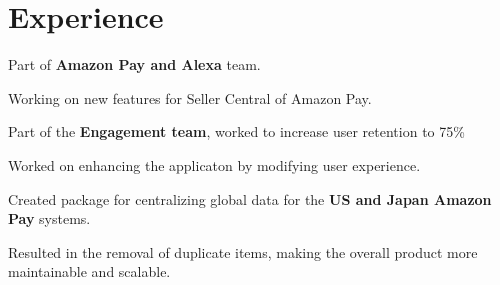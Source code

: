 \documentclass[letterpaper]{deedy-resume} %
\begin{document}
\hfill
%
%
\begin{minipage}[t]{0.66\textwidth} %


\section{Experience}


\vspace{\topsep}
\begin{tightitemize}
\item Part of \textbf{Amazon Pay and Alexa} team.
\item Working on new features for Seller Central of Amazon Pay. 
\end{tightitemize}

\sectionspace %



\begin{tightitemize}
\item Part of the \textbf{Engagement team}, worked to increase user retention to 75\%
\item Worked on enhancing the applicaton by modifying user experience. 
\end{tightitemize}

\sectionspace %



\begin{tightitemize}
\item Created package for centralizing global data for the \textbf{US and Japan Amazon Pay} systems.
\item Resulted in the removal of duplicate items, making the overall product more maintainable and scalable.
\end{tightitemize}


\end{minipage}
\end{document}
